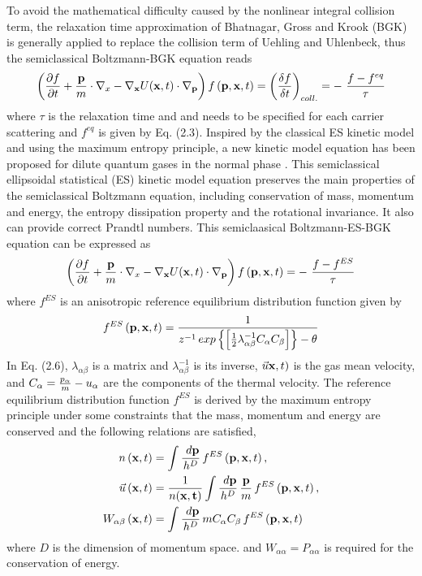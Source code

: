 \documentclass{rsproca}%
\begin{document}
To avoid the mathematical difficulty caused by the nonlinear integral collision term, the relaxation time approximation of Bhatnagar, Gross and Krook (BGK) is generally applied to replace the collision term of Uehling and Uhlenbeck, thus the semiclassical Boltzmann-BGK equation reads
\begin{equation}
\left(\frac{\partial f}{\partial t}+\frac{\bf p}{m}\cdot {\bf\nabla }_x-{\bf \nabla}_{\bf x} U({\bf x},t)\cdot {\bf\nabla }_{\bf p}\right)f\left({\bf p},{\bf x},t\right) =\left(\frac{\delta f}{\delta t}\right)_{coll.}= -\ \frac{f-f^{eq}}{\tau }
\end{equation}
where $\tau$ is the relaxation time and and needs to be specified for each carrier scattering and $f^{eq}$ is given by Eq. (2.3).
Inspired by the classical ES kinetic model \cite{Holway1966} and using the maximum entropy principle, a new kinetic model equation has been proposed for dilute quantum gases in the normal phase \cite{Wu2012}.  This semiclassical ellipsoidal statistical (ES) kinetic model equation preserves the main properties of the semiclassical Boltzmann equation, including conservation of mass, momentum and energy, the entropy dissipation property and the rotational invariance.   It also can provide correct Prandtl numbers.   This semiclaasical Boltzmann-ES-BGK equation can be expressed as
\begin{equation}
\left(\frac{\partial f}{\partial t}+\frac{\bf p}{m}\cdot {\bf\nabla }_x-{\bf \nabla}_{\bf x} U({\bf x},t)\cdot {\bf\nabla }_{\bf p}\right)f\left({\bf p},{\bf x},t\right) = -\ \frac{f-f^{ES}}{\tau }
\end{equation}
where $f^{ES}$ is an anisotropic reference equilibrium distribution function given by
\begin{equation}
f^{ES}\left({\bf p},{\bf x},t\right) =\frac{1}{z^{-1}\,exp\left\{{\left[ {1\over 2} \lambda_{\alpha \beta}^{-1} C_{\alpha} C_{\beta} \right]} \right\} -\theta }
\end{equation}
In Eq. (2.6), $\lambda_{\alpha \beta}$ is a matrix and $\lambda_{\alpha \beta}^{-1}$ is its inverse, $\vec u{\bf x},t)$ is the gas mean velocity, and $C_{\alpha} = {p_{\alpha} \over m }- u_{\alpha}$ are the components of the thermal velocity.
The reference equilibrium distribution function $f^{ES}$ is derived by the maximum entropy principle under some constraints that the mass, momentum and energy are conserved and the following relations are satisfied,
\begin{subequations}
\begin{align}
n\left({\bf x},t\right) &= \int{\frac{\ d{\bf p}}{h^D}}\,f^{ES} \left({\bf p},{\bf x}, t\right), \\
\vec u \left({\bf x},t\right) &= \frac{1}{n(\bf x, t)}\int{\frac{\ d{\bf p}}{h^D}\,\frac{\bf p}{m}}\,f^{ES}\left({\bf p},{\bf x}, t\right), \\
W_{\alpha \beta} \left({\bf x},t\right) &= \int{\frac{\ d{\bf p}}{h^D}\,m C_{\alpha} C_{\beta} \,f^{ES} \left({\bf p},{\bf x}, t\right)}
\end{align}
\end{subequations}
where $D$ is the dimension of momentum space. and $W_{\alpha \alpha} = P_{\alpha \alpha}$ is required for the conservation of energy.
\end{document}

